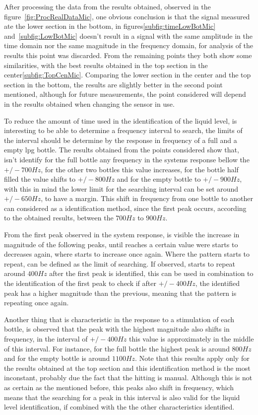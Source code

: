 After processing the data from the results obtained, observed in the figure~\ref{fig:ProcRealDataMic}, one obvious conclusion is that the signal measured ate the lower section in the bottom, in figures\ref{subfig:timeLowBotMic} and~\ref{subfig:LowBotMic} doesn't result in a signal with the same amplitude in the time domain nor the same magnitude in the frequency domain, for analysis of the results this point was discarded. From the remaining points they both show some similarities, with the best results obtained in the top section in the center\ref{subfig:TopCenMic}. Comparing the lower section in the center and the top section in the bottom, the results are slightly better in the second point mentioned, although for future measurements, the point considered will depend in the results obtained when changing the sensor in use.

To reduce the amount of time used in the identification of the liquid level, is interesting to be able to determine a frequency interval to search, the limits of the interval should be determine by the response in frequency of a full and a empty \acrshort{lpg} bottle. The results obtained from the points considered show that, isn't identify for the full bottle any frequency in the systems response bellow the $+/-700Hz$, for the other two bottles this value increases, for the bottle half filled the value shifts to $+/-800Hz$ and for the empty bottle to $+/-900Hz$, with this in mind the lower limit for the searching interval can be set around $+/-650Hz$, to have a margin. This shift in frequency from one bottle to another can considered as a identification method, since the first peak occurs, according to the obtained results, between the $700Hz$ to $900Hz$. 

From the first peak observed in the system response, is visible the increase in magnitude of the following peaks, until reaches a certain value were starts to decreases again, where starts to increase once again. Where the pattern starts to repeat, can be defined as the limit of searching. If observed, starts to repeat around $400Hz$ after the first peak is identified, this can be used in combination to the identification of the first peak to check if after $+/-400Hz$, the identified peak has a higher magnitude than the previous, meaning that the pattern is repeating once again. 

Another thing that is characteristic in the response to a stimulation of each bottle, is observed that the peak with the highest magnitude also shifts in frequency, in the interval of $+/-400Hz$ this value is approximately in the middle of this interval. For instance, for the full bottle the highest peak is around $800Hz$ and for the empty bottle is around $1100Hz$. Note that this results apply only for the results obtained at the top section and this identification method is the most inconstant, probably due the fact that the hitting is manual. Although this is not as certain as the mentioned before, this peaks also shift in frequency, which means that the searching for a peak in this interval is also valid for the liquid level identification, if combined with the the other characteristics identified.

